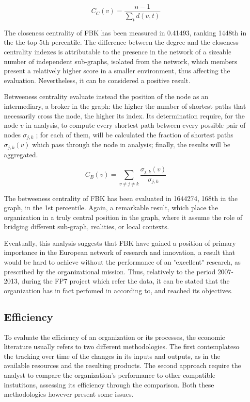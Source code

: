 \[
	C_C (v) =
		\frac 
			{n-1}
			{
				\sum_t d(v, t)
			} 
\]

The closeness centrality of FBK has been measured in 0.41493, ranking 1448th in the the top 5th percentile. The difference between the degree and the closeness centrality indexes is attributable to the presence in the network of a sizeable number of independent sub-graphs, isolated from the network, which members present a relatively higher score in a smaller environment, thus affecting the evaluation. Nevertheless, it can be considered a positive result.  

Betweeness centrality evaluate instead the position of the node as an intermediary, a broker in the graph: the higher the number of shortest paths that necessarily cross the node, the higher its index. Its determination require, for the node $v$ in analysis, to compute every shortest path between every possible pair of nodes $\sigma_{j,k}$ ; for each of them, will be calculated the fraction of shortest paths $\sigma_{j,k} (v)$ which pass through the node in analysis; finally, the results will be aggregated. 

\[
	C_B (v) =
		\sum_{v \neq j \neq k}
			\frac {\sigma_{j,k} (v)}{\sigma_{j,k}}
\]

The betweeness centrality of FBK has been evaluated in 1644274, 168th in the graph, in the 1st percentile. Again, a remarkable result, which place the organization in a truly central position in the graph, where it assume the role of bridging different sub-graph, realities, or local contexts. 

Eventually, this analysis suggests that FBK have gained a position of primary importance in the European network of research and innovation, a result that would be hard to achieve without the performance of an "excellent" research, as prescribed by the organizational mission. Thus, relatively to the period 2007-2013, during the FP7 project which refer the data, it can be stated that the organization has in fact perfomed in according to, and reached its objectives. 

\subsection{Efficiency}

To evaluate the efficiency of an organization or its processes, the economic literature usually refers to two different methodologies. The first contemplateso the tracking over time of the changes in its inputs and outputs, as in the available resources and the resulting products. The second approach require the analyst to compare the organization's performance to other compatible instutitons, assessing its efficiency through the comparison. Both these methodologies however present some issues.

